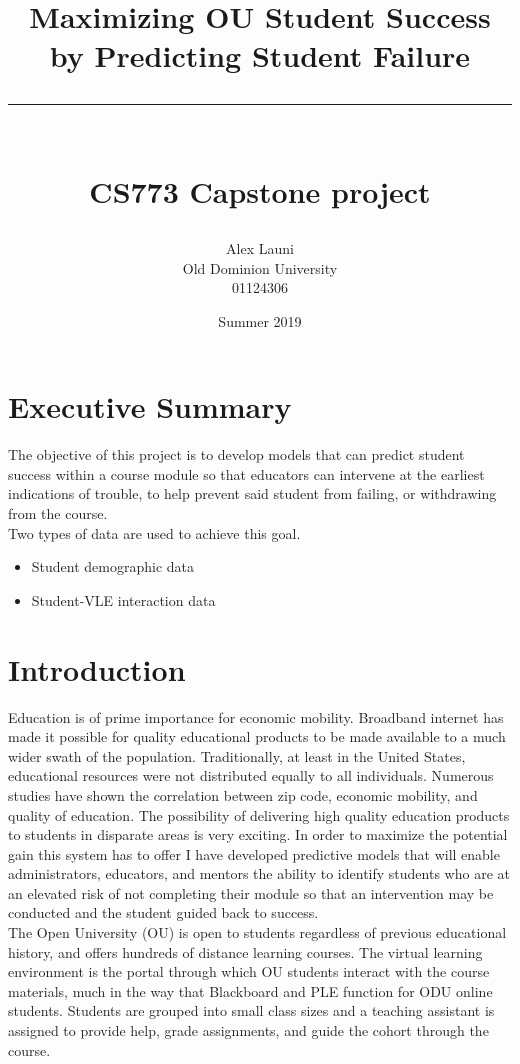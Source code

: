 \documentclass{article}
\title{Maximizing OU Student Success by Predicting Student Failure\\ \rule{\textwidth}{0.5pt}\\CS773 Capstone project}
\author{Alex Launi\\Old Dominion University\\01124306}
\date{Summer 2019}
\begin{document}
\maketitle
\tableofcontents
\listoffigures

\pagebreak
\section{Executive Summary}
The objective of this project is to develop models that can predict student success
within a course module so that educators can intervene at the earliest indications of
trouble, to help prevent said student from failing, or withdrawing from the course.\\
Two types of data are used to achieve this goal.
\begin{itemize}
	\item Student demographic data
	\item Student-VLE interaction data
\end{itemize}

\section{Introduction}
Education is of prime importance for economic mobility. Broadband internet has made
it possible for quality educational products to be made available to a much wider swath
of the population. Traditionally, at least in the United States, educational resources were not
distributed equally to all individuals. Numerous studies have shown the correlation
between zip code, economic mobility, and quality of education. The possibility of delivering
high quality education products to students in disparate areas is very exciting. In order to
maximize the potential gain this system has to offer I have developed predictive models
that will enable administrators, educators, and mentors the ability to identify students who
are at an elevated risk of not completing their module so that an intervention may be conducted
and the student guided back to success.\\

The Open University (OU) is open to students regardless of previous educational history, and offers
hundreds of distance learning courses. The virtual learning environment is the portal through which OU
students interact with the course materials, much in the way that Blackboard and PLE function for ODU
online students. Students are grouped into small class sizes and a teaching assistant is assigned to provide
help, grade assignments, and guide the cohort through the course.\\
\end{document}
